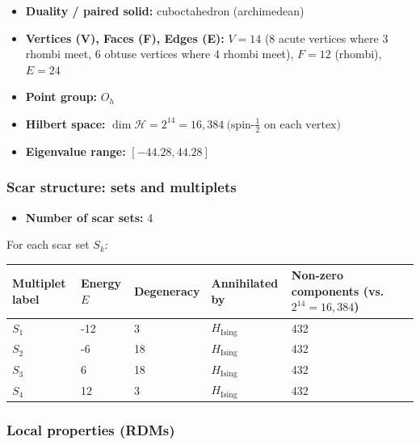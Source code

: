 \documentclass[11pt,a4paper]{article}
\newcommand{\Hising}{H_{\mathrm{Ising}}}
\begin{document}
\begin{itemize}[leftmargin=1.5em]
  \item \textbf{Duality / paired solid:} cuboctahedron (archimedean)
  \item \textbf{Vertices (V), Faces (F), Edges (E):} $V = 14$ (8 acute vertices where 3 rhombi meet, 6 obtuse vertices where 4 rhombi meet),\; $F = 12$ (rhombi),\; $E = 24$
  \item \textbf{Point group:} $O_h$
  \item \textbf{Hilbert space:} \(
        \dim\mathcal{H} = 2^{14} = 16,384\ \text{(spin-$\tfrac12$ on each vertex)}
        \)
  \item \textbf{Eigenvalue range:} $[-44.28, 44.28]$
\end{itemize}

\subsubsection*{Scar structure: sets and multiplets}

\begin{itemize}[leftmargin=1.5em]
  \item \textbf{Number of scar sets:} 4
  \end{itemize}
  \hspace{6mm}For each scar set $S_k$:\\

\begin{center}
\begin{tabular}{L{3.5cm} C{2.2cm} C{2.2cm} C{2.2cm} C{3.0cm} C{3.2cm}}
\toprule
\textbf{Multiplet label} & \textbf{Energy $E$} & \textbf{Degeneracy} & \textbf{Annihilated by} & \textbf{Non-zero components (vs.\ $2^{14} = 16,384$)} \\
\midrule
$S_1$ & -12 & 3 & $\Hising$ & 432\\
\midrule
$S_2$ & -6 & 18 & $\Hising$ & 432\\
\midrule
$S_3$ & 6 & 18 & $\Hising$ & 432\\
\midrule
$S_4$ & 12 & 3 & $\Hising$ & 432\\
\bottomrule
\end{tabular}
\end{center}

\subsubsection*{Local properties (RDMs)}
\end{document}
